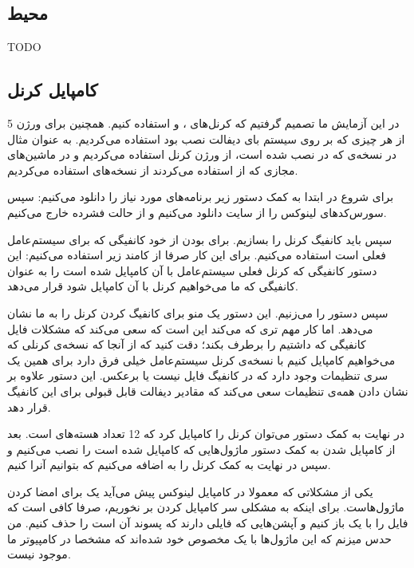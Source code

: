 \subsection{محیط‌ }
TODO

\subsection{کامپایل کرنل}
در این آزمایش ما تصمیم گرفتیم که کرنل‌های
،  و 
استفاده کنیم. همچنین برای ورژن 5 از هر چیزی که بر روی سیستم بای دیفالت نصب بود استفاده می‌کردیم.
به عنوان مثال در نسخه‌ی
که در
نصب شده است، از ورژن کرنل
استفاده می‌کردیم و در ماشین‌های مجازی که از
استفاده می‌کردند از نسخه‌های
استفاده می‌کردیم.

برای شروع در ابتدا به کمک دستور زیر برنامه‌های مورد نیاز را دانلود می‌کنیم:
سپس سورس‌کد‌های لینوکس را از سایت
دانلود می‌کنیم و از حالت فشرده خارج می‌کنیم.

سپس باید کانفیگ کرنل را بسازیم. برای
بودن از خود کانفیگی که برای سیستم‌عامل فعلی است استفاده می‌کنیم. برای این کار صرفا از کامند زیر
استفاده می‌کنیم:
این دستور کانفیگی که کرنل فعلی سیستم‌عامل با آن کامپایل شده است را به عنوان کانفیگی که ما می‌خواهیم
کرنل با آن کامپایل شود قرار می‌دهد.

سپس دستور
را می‌زنیم. این دستور یک منو برای کانفیگ کردن کرنل را به ما نشان می‌دهد. اما کار مهم تری که می‌کند این است که
سعی می‌کند که مشکلات فایل کانفیگی که داشتیم را برطرف بکند؛ دقت کنید که از آنجا که نسخه‌ی کرنلی که می‌خواهیم
کامپایل کنیم با نسخه‌ی کرنل سیستم‌عامل خیلی فرق دارد برای همین یک سری تنظیمات وجود دارد که در کانفیگ فایل نیست
یا برعکس. این دستور علاوه بر نشان دادن همه‌ی تنظیمات سعی می‌کند که مقادیر دیفالت قابل قبولی برای
این کانفیگ قرار دهد.

در نهایت به کمک دستور
می‌توان کرنل را کامپایل کرد که 12 تعداد هسته‌های
است. بعد از کامپایل شدن به کمک دستور
ماژول‌هایی که کامپایل شده است را نصب می‌کنیم و سپس در نهایت به کمک
کرنل را به
اضافه می‌کنیم که بتوانیم آنرا
کنیم.

یکی از مشکلاتی که معمولا در کامپایل لینوکس پیش می‌آید یک
برای امضا کردن ماژول‌هاست. برای اینکه به مشکلی سر کامپایل کردن بر نخوریم، صرفا کافی است که فایل
را با یک
باز کنیم و آپشن‌هایی که فایلی دارند که پسوند آن
است را حذف کنیم. من حدس میزنم که این ماژول‌ها با یک
مخصوص خود
شده‌اند که مشخصا در کامپیوتر ما موجود نیست.

